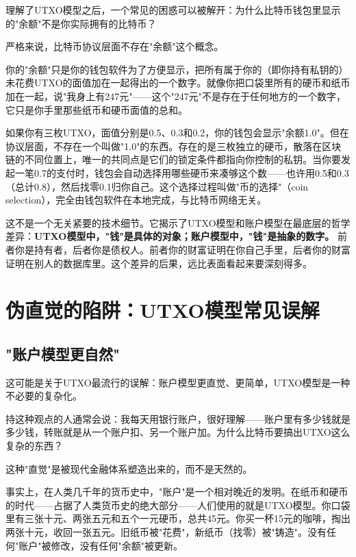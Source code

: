 \documentclass[a4paper,12pt,openany]{ctexbook}
\begin{document}
理解了UTXO模型之后，一个常见的困惑可以被解开：为什么比特币钱包里显示的"余额"不是你实际拥有的比特币？

严格来说，比特币协议层面不存在"余额"这个概念。

你的"余额"只是你的钱包软件为了方便显示，把所有属于你的（即你持有私钥的）未花费UTXO的面值加在一起得出的一个数字。就像你把口袋里所有的硬币和纸币加在一起，说"我身上有247元"——这个"247元"不是存在于任何地方的一个数字，它只是你手里那些纸币和硬币面值的总和。

如果你有三枚UTXO，面值分别是0.5、0.3和0.2，你的钱包会显示"余额1.0"。但在协议层面，不存在一个叫做"1.0"的东西。存在的是三枚独立的硬币，散落在区块链的不同位置上，唯一的共同点是它们的锁定条件都指向你控制的私钥。当你要发起一笔0.7的支付时，钱包会自动选择用哪些硬币来凑够这个数——也许用0.5和0.3（总计0.8），然后找零0.1归你自己。这个选择过程叫做"币的选择"（coin selection），完全由钱包软件在本地完成，与比特币网络无关。

这不是一个无关紧要的技术细节。它揭示了UTXO模型和账户模型在最底层的哲学差异：\textbf{UTXO模型中，"钱"是具体的对象；账户模型中，"钱"是抽象的数字。} 前者你是持有者，后者你是债权人。前者你的财富证明在你自己手里，后者你的财富证明在别人的数据库里。这个差异的后果，远比表面看起来要深刻得多。


\section*{伪直觉的陷阱：UTXO模型常见误解}



\subsection*{"账户模型更自然"}


这可能是关于UTXO最流行的误解：账户模型更直觉、更简单，UTXO模型是一种不必要的复杂化。

持这种观点的人通常会说：我每天用银行账户，很好理解——账户里有多少钱就是多少钱，转账就是从一个账户扣、另一个账户加。为什么比特币要搞出UTXO这么复杂的东西？

这种"直觉"是被现代金融体系塑造出来的，而不是天然的。

事实上，在人类几千年的货币史中，"账户"是一个相对晚近的发明。在纸币和硬币的时代——占据了人类货币史的绝大部分——人们使用的就是UTXO模型。你口袋里有三张十元、两张五元和五个一元硬币，总共45元。你买一杯15元的咖啡，掏出两张十元，收回一张五元。旧纸币被"花费"，新纸币（找零）被"铸造"。没有任何"账户"被修改，没有任何"余额"被更新。
\end{document}
